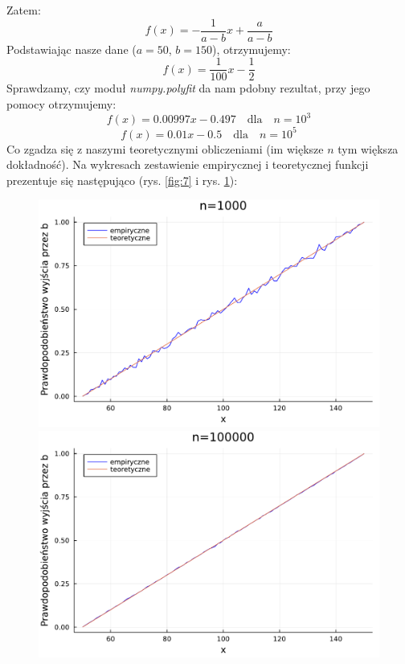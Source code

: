 \documentclass{article}
\theoremstyle{break}
\begin{document}
Zatem:
$$f(x)=-\frac{1}{a-b}x + \frac{a}{a-b}$$
Podstawiając nasze dane ($a=50$, $b=150$), otrzymujemy:
$$f(x)=\frac{1}{100}x-\frac{1}{2}$$
Sprawdzamy, czy moduł \textit{numpy.polyfit} da nam pdobny rezultat, przy jego pomocy otrzymujemy:
$$f(x)=0.00997x-0.497 \quad \mathrm{dla} \quad n=10^3$$
$$f(x)=0.01x-0.5 \quad \mathrm{dla} \quad n=10^5$$
Co zgadza się z naszymi teoretycznymi obliczeniami (im większe $n$ tym większa dokładność). Na wykresach zestawienie empirycznej i teoretycznej funkcji prezentuje się następująco (rys. \ref{fig:7} i rys. \ref{fig:8}):
\begin{figure}[H]
	\begin{multicols}{2}
		\begin{center}
			\includegraphics[scale=0.30]{prob100poly.pdf}
			\caption{}
			\label{fig:7}
			\includegraphics[scale=0.30]{prob100000poly.pdf}
			\caption{}
			\label{fig:8}
		\end{center}
	\end{multicols}
\end{figure}
\end{document}
